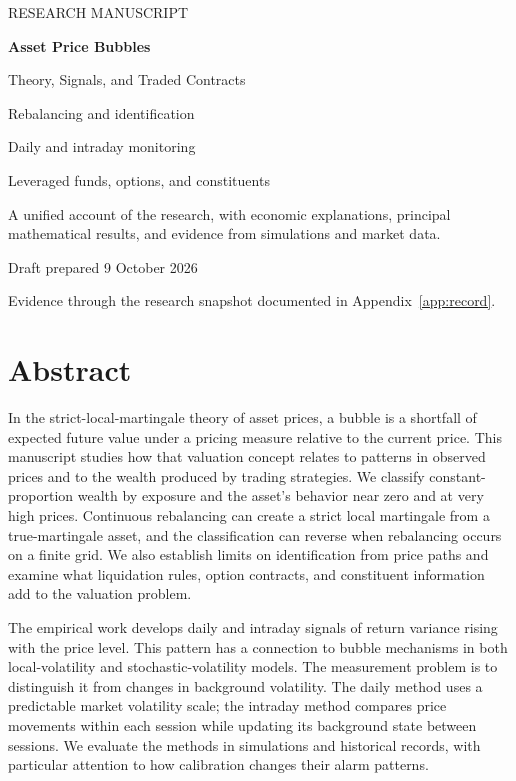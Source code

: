 \begin{titlepage}
\thispagestyle{empty}
\vspace*{1.0in}
{\color{accent}\large RESEARCH MANUSCRIPT\par}
\vspace{0.4in}
{\color{ink}\fontsize{34}{39}\selectfont\bfseries Asset Price Bubbles\par}
\vspace{0.22in}
{\color{ink}\LARGE Theory, Signals, and Traded Contracts\par}
\vspace{0.5in}
{\large Rebalancing and identification\par
Daily and intraday monitoring\par
Leveraged funds, options, and constituents\par}
\vfill
\noindent A unified account of the research, with economic explanations,
principal mathematical results, and evidence from simulations and market data.
\par\bigskip
\noindent Draft prepared 9 October 2026\par
\noindent Evidence through the research snapshot documented in Appendix~\ref{app:record}.
\end{titlepage}
\section*{Abstract}
{}
In the strict-local-martingale theory of asset prices, a bubble is a
shortfall of expected future value under a pricing measure relative to the
current price. This manuscript studies how that valuation concept relates
to patterns in observed prices and to the wealth produced by trading
strategies. We classify constant-proportion wealth by exposure and the
asset's behavior near zero and at very high prices. Continuous rebalancing
can create a strict local martingale from a true-martingale asset, and the
classification can reverse when rebalancing occurs on a finite grid. We
also establish limits on identification from price paths and examine what
liquidation rules, option contracts, and constituent information add to
the valuation problem.

The empirical work develops daily and intraday signals of return variance
rising with the price level. This pattern has a connection to bubble
mechanisms in both local-volatility and stochastic-volatility models.
The measurement problem is to distinguish it from changes in background
volatility. The daily method uses a predictable market volatility scale;
the intraday method compares price movements within each session while
updating its background state between sessions. We evaluate the methods
in simulations and historical records, with particular attention to how
calibration changes their alarm patterns.


